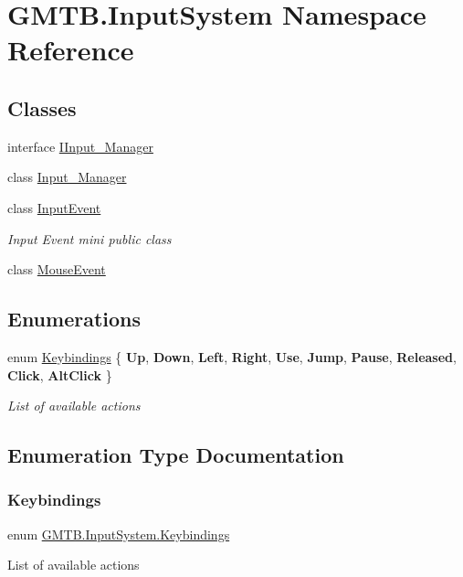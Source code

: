 \hypertarget{namespace_g_m_t_b_1_1_input_system}{}\section{G\+M\+T\+B.\+Input\+System Namespace Reference}
\label{namespace_g_m_t_b_1_1_input_system}
\subsection*{Classes}
\begin{DoxyCompactItemize}
\item 
interface \mbox{\hyperlink{interface_g_m_t_b_1_1_input_system_1_1_i_input___manager}{I\+Input\+\_\+\+Manager}}
\item 
class \mbox{\hyperlink{class_g_m_t_b_1_1_input_system_1_1_input___manager}{Input\+\_\+\+Manager}}
\item 
class \mbox{\hyperlink{class_g_m_t_b_1_1_input_system_1_1_input_event}{Input\+Event}}
\begin{DoxyCompactList}\small\item\em Input Event mini public class \end{DoxyCompactList}\item 
class \mbox{\hyperlink{class_g_m_t_b_1_1_input_system_1_1_mouse_event}{Mouse\+Event}}
\end{DoxyCompactItemize}
\subsection*{Enumerations}
\begin{DoxyCompactItemize}
\item 
enum \mbox{\hyperlink{namespace_g_m_t_b_1_1_input_system_a29c73b630f79093ef12619656209d6c1}{Keybindings}} \{ \newline
{\bfseries Up}, 
{\bfseries Down}, 
{\bfseries Left}, 
{\bfseries Right}, 
\newline
{\bfseries Use}, 
{\bfseries Jump}, 
{\bfseries Pause}, 
{\bfseries Released}, 
\newline
{\bfseries Click}, 
{\bfseries Alt\+Click}
 \}
\begin{DoxyCompactList}\small\item\em List of available actions \end{DoxyCompactList}\end{DoxyCompactItemize}


\subsection{Enumeration Type Documentation}
\mbox{\label{namespace_g_m_t_b_1_1_input_system_a29c73b630f79093ef12619656209d6c1}} 
\subsubsection{\texorpdfstring{Keybindings}{Keybindings}}
{\footnotesize\ttfamily enum \mbox{\hyperlink{namespace_g_m_t_b_1_1_input_system_a29c73b630f79093ef12619656209d6c1}{G\+M\+T\+B.\+Input\+System.\+Keybindings}}\hspace{0.3cm}{\ttfamily [strong]}}



List of available actions 

